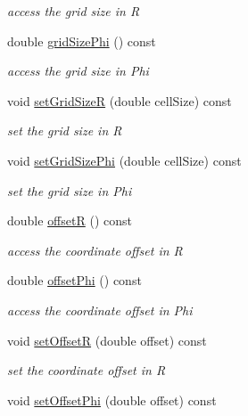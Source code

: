 \begin{DoxyCompactItemize}
\begin{DoxyCompactList}\small\item\em access the grid size in R \end{DoxyCompactList}\item 
double \hyperlink{class_d_d4hep_1_1_geometry_1_1_polar_grid_r_phi_a5ea6223d6640563acb3e89d6d4cd86b4}{grid\+Size\+Phi} () const
\begin{DoxyCompactList}\small\item\em access the grid size in Phi \end{DoxyCompactList}\item 
void \hyperlink{class_d_d4hep_1_1_geometry_1_1_polar_grid_r_phi_a9ce4b7bd15fc170879e2bfea38c9baf1}{set\+Grid\+SizeR} (double cell\+Size) const
\begin{DoxyCompactList}\small\item\em set the grid size in R \end{DoxyCompactList}\item 
void \hyperlink{class_d_d4hep_1_1_geometry_1_1_polar_grid_r_phi_a716334b8d752c594c8f68bcd07b52519}{set\+Grid\+Size\+Phi} (double cell\+Size) const
\begin{DoxyCompactList}\small\item\em set the grid size in Phi \end{DoxyCompactList}\item 
double \hyperlink{class_d_d4hep_1_1_geometry_1_1_polar_grid_r_phi_a26a73edbc1c84b1f6bcbb37a8b699020}{offsetR} () const
\begin{DoxyCompactList}\small\item\em access the coordinate offset in R \end{DoxyCompactList}\item 
double \hyperlink{class_d_d4hep_1_1_geometry_1_1_polar_grid_r_phi_abe6c24dd18a2141368d00843fe69b44e}{offset\+Phi} () const
\begin{DoxyCompactList}\small\item\em access the coordinate offset in Phi \end{DoxyCompactList}\item 
void \hyperlink{class_d_d4hep_1_1_geometry_1_1_polar_grid_r_phi_a6f540807e325eccbb97e2408304bf06a}{set\+OffsetR} (double offset) const
\begin{DoxyCompactList}\small\item\em set the coordinate offset in R \end{DoxyCompactList}\item 
void \hyperlink{class_d_d4hep_1_1_geometry_1_1_polar_grid_r_phi_a246e0c3156b3f76a870bb74f5bc1a346}{set\+Offset\+Phi} (double offset) const

\end{DoxyCompactItemize}
